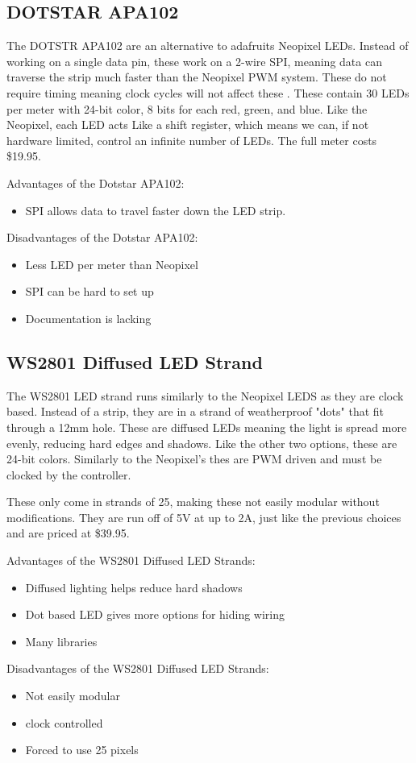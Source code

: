 \documentclass[onecolumn, draftclsnofoot,10pt, compsoc]{IEEEtran}
\begin{document}
		\subsection{DOTSTAR APA102}
		\noindent The DOTSTR APA102 are an alternative to adafruits Neopixel LEDs. Instead
		of working on a single data pin, these work on a 2-wire SPI, meaning data
		can traverse the strip much faster than the Neopixel PWM system. These do
		not require timing meaning clock cycles will not affect these
		\cite[Pg2]{dotstar}. These contain 30 LEDs per meter with 24-bit color,
		8 bits for each red, green, and blue. Like the Neopixel, each LED acts Like
		a shift register, which means we can, if not hardware limited, control an
		infinite number of LEDs. The full meter costs \$19.95.

		\vspace{5mm}
		\noindent Advantages of the Dotstar APA102:
		\begin{itemize}
			\item SPI allows data to travel faster down the LED strip.
		\end{itemize}
		Disadvantages of the Dotstar APA102:
		\begin{itemize}
			\item Less LED per meter than Neopixel
			\item SPI can be hard to set up
			\item Documentation is lacking
		\end{itemize}
		\subsection{WS2801 Diffused LED Strand}
		\noindent The WS2801 LED strand runs similarly to the Neopixel LEDS as they
		are clock based. Instead of a strip, they are in a strand of weatherproof
		"dots" that fit through a 12mm hole\cite[Pg 7]{strand}. These are diffused
		LEDs meaning the light is spread more evenly, reducing hard edges and
		shadows. Like the other two options, these are 24-bit colors. Similarly to
		the Neopixel's thes are PWM driven and must be clocked by the controller.

		\vspace{5mm}
		\noindent These only come in strands of 25, making these not easily modular without
		modifications. They are run off of 5V at up to 2A, just like the previous
		choices and are priced at \$39.95.

		\vspace{5mm}
		\noindent Advantages of the WS2801 Diffused LED Strands:
		\begin{itemize}
			\item Diffused lighting helps reduce hard shadows
			\item Dot based LED gives more options for hiding wiring
			\item Many libraries
		\end{itemize}
		Disadvantages of the WS2801 Diffused LED Strands:
		\begin{itemize}
			\item Not easily modular
			\item clock controlled
			\item Forced to use 25 pixels
		\end{itemize}
\end{document}
